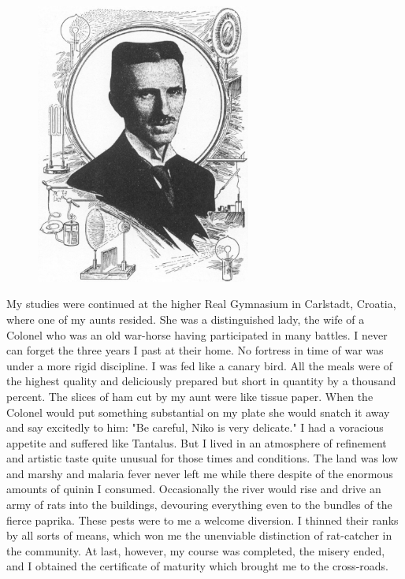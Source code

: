 \documentclass[a4paper,12pt,english,twoside,openright]{memoir}
\begin{document}
\begin{figure}
	\vspace{-20pt}
	\begin{center}
		\includegraphics[width=0.63\textwidth]{Tesla-60.png}
	\end{center}
	\vspace{-20pt}
\end{figure}

My studies were continued at the higher Real Gymnasium in Carlstadt, Croatia, where one of my 
aunts resided.  She was a distinguished lady, the wife of a Colonel who was an old war-horse 
having participated in many battles.  I never can forget the three years I past at their home.  No 
fortress in time of war was under a more rigid discipline.  I was fed like a canary bird.  All the 
meals were of the highest quality and deliciously prepared but short in quantity by a thousand 
percent.  The slices of ham cut by my aunt were like tissue paper.  When the Colonel would put 
something substantial on my plate she would snatch it away and say excitedly to him: "Be careful, 
Niko is very delicate." I had a voracious appetite and suffered like Tantalus.  But I lived in an 
atmosphere of refinement and artistic taste quite unusual for those times and conditions.  The 
land was low and marshy and malaria fever never left me while there despite of the enormous 
amounts of quinin I consumed.  Occasionally the river would rise and drive an army of rats into 
the buildings, devouring everything even to the bundles of the fierce paprika.  These pests were 
to me a welcome diversion.  I thinned their ranks by all sorts of means, which won me the 
unenviable distinction of rat-catcher in the community.  At last, however, my course was 
completed, the misery ended, and I obtained the certificate of maturity which brought me to the 
cross-roads.  
\end{document}
